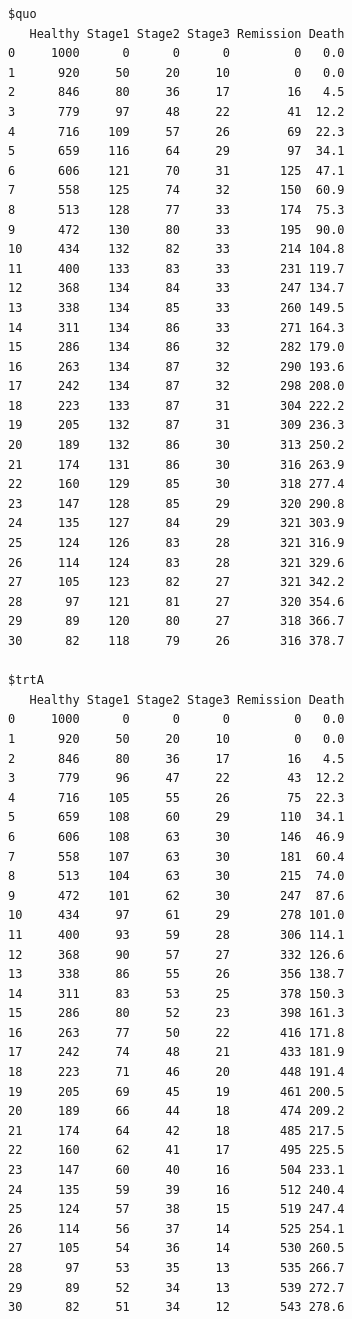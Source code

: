 \documentclass[
  letterpaper,
  DIV=11,
  numbers=noendperiod,
  oneside]{scrartcl}
\begin{document}
\begin{verbatim}
$quo
   Healthy Stage1 Stage2 Stage3 Remission Death
0     1000      0      0      0         0   0.0
1      920     50     20     10         0   0.0
2      846     80     36     17        16   4.5
3      779     97     48     22        41  12.2
4      716    109     57     26        69  22.3
5      659    116     64     29        97  34.1
6      606    121     70     31       125  47.1
7      558    125     74     32       150  60.9
8      513    128     77     33       174  75.3
9      472    130     80     33       195  90.0
10     434    132     82     33       214 104.8
11     400    133     83     33       231 119.7
12     368    134     84     33       247 134.7
13     338    134     85     33       260 149.5
14     311    134     86     33       271 164.3
15     286    134     86     32       282 179.0
16     263    134     87     32       290 193.6
17     242    134     87     32       298 208.0
18     223    133     87     31       304 222.2
19     205    132     87     31       309 236.3
20     189    132     86     30       313 250.2
21     174    131     86     30       316 263.9
22     160    129     85     30       318 277.4
23     147    128     85     29       320 290.8
24     135    127     84     29       321 303.9
25     124    126     83     28       321 316.9
26     114    124     83     28       321 329.6
27     105    123     82     27       321 342.2
28      97    121     81     27       320 354.6
29      89    120     80     27       318 366.7
30      82    118     79     26       316 378.7

$trtA
   Healthy Stage1 Stage2 Stage3 Remission Death
0     1000      0      0      0         0   0.0
1      920     50     20     10         0   0.0
2      846     80     36     17        16   4.5
3      779     96     47     22        43  12.2
4      716    105     55     26        75  22.3
5      659    108     60     29       110  34.1
6      606    108     63     30       146  46.9
7      558    107     63     30       181  60.4
8      513    104     63     30       215  74.0
9      472    101     62     30       247  87.6
10     434     97     61     29       278 101.0
11     400     93     59     28       306 114.1
12     368     90     57     27       332 126.6
13     338     86     55     26       356 138.7
14     311     83     53     25       378 150.3
15     286     80     52     23       398 161.3
16     263     77     50     22       416 171.8
17     242     74     48     21       433 181.9
18     223     71     46     20       448 191.4
19     205     69     45     19       461 200.5
20     189     66     44     18       474 209.2
21     174     64     42     18       485 217.5
22     160     62     41     17       495 225.5
23     147     60     40     16       504 233.1
24     135     59     39     16       512 240.4
25     124     57     38     15       519 247.4
26     114     56     37     14       525 254.1
27     105     54     36     14       530 260.5
28      97     53     35     13       535 266.7
29      89     52     34     13       539 272.7
30      82     51     34     12       543 278.6


\end{verbatim}
\end{document}

